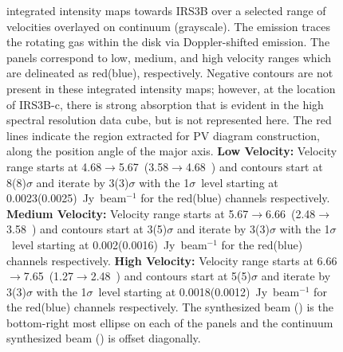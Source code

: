 \begin{figure}[H]
   \caption{\cso\space integrated intensity maps towards IRS3B over a selected range of velocities overlayed on continuum (grayscale). The \cso\space emission traces the rotating gas within the disk via Doppler-shifted emission. The panels correspond to low, medium, and high velocity ranges which are delineated as red(blue), respectively. Negative contours are not present in these integrated intensity maps; however, at the location of IRS3B-c, there is strong absorption that is evident in the high spectral resolution data cube, but is not represented here. The red lines indicate the region extracted for PV diagram construction, along the position angle of the major axis. \textbf{Low Velocity:} Velocity range starts at 4.68$\rightarrow$5.67~\kms (3.58$\rightarrow$4.68~\kms) and contours start at 8(8)$\sigma$ and iterate by 3(3)$\sigma$ with the 1$\sigma$~level starting at 0.0023(0.0025)~Jy~beam$^{-1}$ for the red(blue) channels respectively. \textbf{Medium Velocity:} Velocity range starts at 5.67$\rightarrow$6.66~\kms (2.48$\rightarrow$3.58~\kms) and contours start at 3(5)$\sigma$ and iterate by 3(3)$\sigma$ with the 1$\sigma$~level starting at 0.002(0.0016)~Jy~beam$^{-1}$ for the red(blue) channels respectively. \textbf{High Velocity:} Velocity range starts at 6.66$\rightarrow$7.65~\kms (1.27$\rightarrow$2.48~\kms) and contours start at 5(5)$\sigma$ and iterate by 3(3)$\sigma$ with the 1$\sigma$~level starting at 0.0018(0.0012)~Jy~beam$^{-1}$ for the red(blue) channels respectively. The \cso\space synthesized beam (\csobeam) is the bottom-right most ellipse on each of the panels and the continuum synthesized beam (\contbeam) is offset diagonally.}\label{fig:irs3bc17omoment}
\end{figure}





